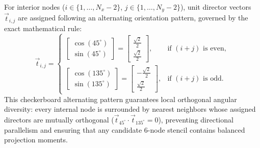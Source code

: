 \documentclass[preprint,12pt]{elsarticle}
\begin{document}
For interior nodes ($i \in \{1, \dots, N_x-2\}$, $j \in \{1, \dots, N_y-2\}$), unit director vectors $\vec{t}_{i,j}$ are assigned following an alternating orientation pattern, governed by the exact mathematical rule:
\begin{equation}
    \vec{t}_{i,j} = \begin{cases}
        \begin{bmatrix} \cos(45^\circ) \\ \sin(45^\circ) \end{bmatrix} = \begin{bmatrix} \frac{\sqrt{2}}{2} \\ \frac{\sqrt{2}}{2} \end{bmatrix},      & \text{if } (i + j) \text{ is even}, \\[10pt]
        \begin{bmatrix} \cos(135^\circ) \\ \sin(135^\circ) \end{bmatrix} = \begin{bmatrix} -\frac{\sqrt{2}}{2} \\ \frac{\sqrt{2}}{2} \end{bmatrix}, & \text{if } (i + j) \text{ is odd}.
    \end{cases}
    \label{eq:alternating_directors_def}
\end{equation}
This checkerboard alternating pattern guarantees local orthogonal angular diversity: every internal node is surrounded by nearest neighbors whose assigned directors are mutually orthogonal ($\vec{t}_{45^\circ} \cdot \vec{t}_{135^\circ} = 0$), preventing directional parallelism and ensuring that any candidate 6-node stencil contains balanced projection moments.
\end{document}
